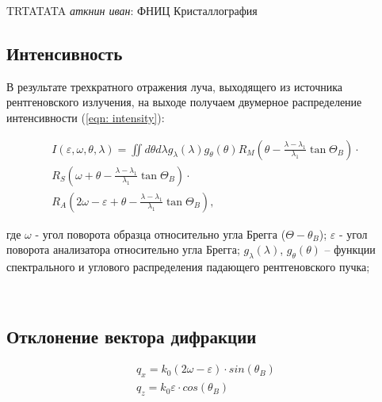 \documentclass[journal]{IEEEtran}
\begin{document}
\title{\small}
{TRTATATA \MakeLowercase{\textit{Аткнин Иван}}: ФНИЦ Кристаллография}




\textcolor{BrickRed}{\section{Интенсивность}}
В результате трехкратного отражения луча, выходящего из источника рентгеновского 
излучения, на выходе получаем двумерное распределение интенсивности (\ref{eqn: intensity}):

\begin{eqnarray}
\label{eqn: intensity}
	 I(\varepsilon,\omega, \theta, \lambda) =  \iint d\theta d\lambda g_\lambda(\lambda)  g_\theta(\theta) 
	 R_M\left(\theta-\frac{\lambda-\lambda_1}{\lambda_1}\tan\Theta_B \right) \cdot \nonumber \\  
	R_S\left(\omega+\theta-\frac{\lambda-\lambda_1}{\lambda_1}\tan\Theta_B\right) \cdot \nonumber \\  
	R_A\left(2\omega - \varepsilon+\theta-\frac{\lambda-\lambda_1}{\lambda_1}\tan\Theta_B\right),
\end{eqnarray}

где $\omega$ - угол поворота образца относительно угла Брегга ($\Theta - \theta_B$);
$\varepsilon$  - угол поворота анализатора относительно угла Брегга;  $g_\lambda(\lambda)$, $g_\theta(\theta)$ – функции спектрального и углового распределения падающего рентгеновского пучка; 

\hrulefill \\

\textcolor{BrickRed}{\section{Отклонение вектора дифракции}}
\begin{eqnarray}
\label{eqn: qx_qz}
	 q_x = k_0 (2\omega - \varepsilon) \cdot sin(\theta_B) \\
	 q_z = k_0 \varepsilon \cdot cos(\theta_B) 
\end{eqnarray}
\end{document}
